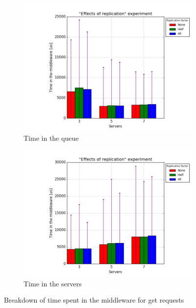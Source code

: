\documentclass[11pt]{article}
\begin{document}

\begin{figure}
\centering
\begin{subfigure}{.5\textwidth}
	\centering
	\includegraphics[width=\linewidth]{plots/replication-get-queue}
	\caption{Time in the queue}
	\label{fig:replication-get-queue}
\end{subfigure}%
\begin{subfigure}{.5\textwidth}
	\centering
	\includegraphics[width=\linewidth]{plots/replication-get-servers}
	\caption{Time in the servers}
	\label{fig:replication-get-servers}
\end{subfigure}
\caption{Breakdown of time spent in the middleware for get requests}
\label{fig:replication-get-breakdown}
\end{figure}
\end{document}
